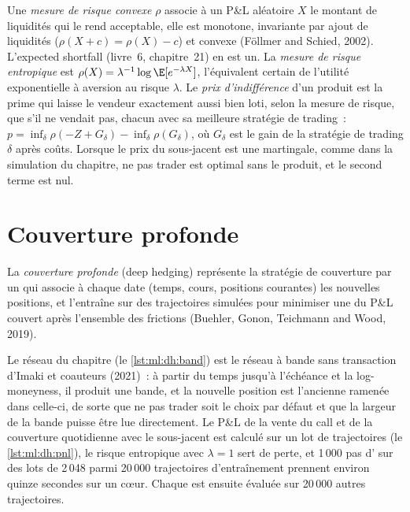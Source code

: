 \begin{definition}\label{def:ml:deep-hedging-and-machine-learning-in-pricing:risk}
Une \emph{mesure de risque convexe} $\rho$ associe à un P\&L aléatoire $X$ le montant de liquidités qui le rend
acceptable, elle est monotone, invariante par ajout de liquidités ($\rho(X + c) = \rho(X) - c$) et convexe (Föllmer and Schied, 2002).
L'expected shortfall (livre~6, chapitre~21) en est un. La \emph{mesure de risque entropique} est $\rho(X) =
\lambda^{-1}\log\E[e^{-\lambda X}]$, l'équivalent certain de l'utilité exponentielle à aversion au risque $\lambda$. Le
\emph{prix d'indifférence} d'un produit est la prime qui laisse le vendeur exactement aussi bien loti, selon
la mesure de risque, que s'il ne vendait pas, chacun avec sa meilleure stratégie de trading~: $p = \inf_\delta\rho(-Z + G_\delta) -
\inf_\delta\rho(G_\delta)$, où $G_\delta$ est le gain de la stratégie de trading $\delta$ après coûts. Lorsque le
prix du sous-jacent est une martingale, comme dans la simulation du chapitre, ne pas trader est optimal sans le produit, et le second terme est nul.
\end{definition}

\section{Couverture profonde}

\begin{definition}\label{def:ml:deep-hedging-and-machine-learning-in-pricing:dh}
La \emph{couverture profonde} (deep hedging) représente la stratégie de couverture par un  qui associe à
chaque date (temps, cours, positions courantes) les nouvelles positions, et l'entraîne sur des trajectoires simulées pour minimiser une  du P\&L couvert après l'ensemble des frictions (Buehler, Gonon, Teichmann and Wood, 2019).
\end{definition}

Le réseau du chapitre (le \cref{lst:ml:dh:band}) est le réseau à bande sans transaction d'Imaki et coauteurs (2021)~: à partir du
temps jusqu'à l'échéance et la log-moneyness, il produit une bande, et la nouvelle position est l'ancienne ramenée dans celle-ci, de sorte que ne pas
trader soit le choix par défaut et que la largeur de la bande puisse être lue directement. Le P\&L de la vente du call et de la couverture quotidienne avec le
sous-jacent est calculé sur un lot de trajectoires (le \cref{lst:ml:dh:pnl}), le risque entropique avec $\lambda = 1$ sert de perte, et 1\,000
pas d' sur des lots de 2\,048 parmi 20\,000 trajectoires d'entraînement prennent environ quinze secondes sur un cœur. Chaque  est ensuite évaluée
sur 20\,000 autres trajectoires.

